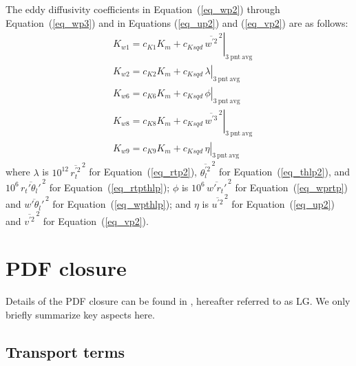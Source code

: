 \documentclass[11pt,fleqn]{article}
\begin{document}
The eddy diffusivity coefficients in Equation~(\ref{eq_wp2}) through 
Equation~(\ref{eq_wp3}) and in Equations (\ref{eq_up2}) and (\ref{eq_vp2}) 
are as follows:
\begin{displaymath}
\begin{split}
& K_{w1} = c_{K1} K_m + \left. c_{Ksqd} \, \overline{w^{'2}}^{\, 2} 
                        \right|_{\mathrm{3 \ pnt \ avg}} \\
& K_{w2} = c_{K2} K_m + \left. c_{Ksqd} \, \lambda
                        \right|_{\mathrm{3 \ pnt \ avg}} \\
& K_{w6} = c_{K6} K_m + \left. c_{Ksqd} \, \phi
                        \right|_{\mathrm{3 \ pnt \ avg}} \\
& K_{w8} = c_{K8} K_m + \left. c_{Ksqd} \, \overline{w^{'3}}^{\, 2} 
                        \right|_{\mathrm{3 \ pnt \ avg}} \\
& K_{w9} = c_{K9} K_m + \left. c_{Ksqd} \, \eta
                        \right|_{\mathrm{3 \ pnt \ avg}}
\end{split}
\end{displaymath}
%
where $\lambda$ is $10^{12} \, \overline{r_t^{'2}}^{\, 2}$ for 
Equation~(\ref{eq_rtp2}), $\overline{\theta_l^{'2}}^{\, 2}$ for 
Equation~(\ref{eq_thlp2}), and $10^6 \, \overline{r_t'\theta_l'}^{\, 2}$ 
for Equation~(\ref{eq_rtpthlp});
$\phi$ is $10^6 \, \overline{w'r_t'}^{\, 2}$ for Equation~(\ref{eq_wprtp})
and $\overline{w'\theta_l'}^{\, 2}$ for Equation~(\ref{eq_wpthlp}); and
$\eta$ is $\overline{u^{'2}}^{\, 2}$ for Equation~(\ref{eq_up2}) and 
$\overline{v^{'2}}^{\, 2}$ for Equation~(\ref{eq_vp2}).
%

\section{PDF closure}

Details of the PDF closure can be found in \citet{larson2005a}, hereafter
referred to as LG. We only briefly summarize key aspects here.

\subsection{Transport terms}
\end{document}

